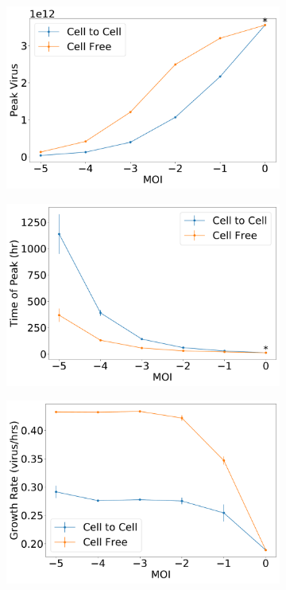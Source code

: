 \documentclass[a4paper]{article}
\begin{document}
\begin{figure}[h]
    \centering
    \begin{subfigure}[b]{0.4\linewidth}
        \includegraphics[width=\linewidth]{Graphs/PeakViralTittervsMOI.pdf}
        \caption{}
        \label{fig:Peak_virus_of_both_transmission_modes}
    \end{subfigure}
    \begin{subfigure}[b]{0.4\linewidth}
        \includegraphics[width=\linewidth]{Graphs/PeakViralTitterTimevsMOI.pdf}
        \caption{}
        \label{fig:Peak_time_of_both_transmission_modes}
    \end{subfigure}
    \begin{subfigure}[b]{0.4\linewidth}
        \includegraphics[width=\linewidth]{Graphs/UpSlopevsMOI.pdf}

\end{subfigure}
\end{figure}
\end{document}
